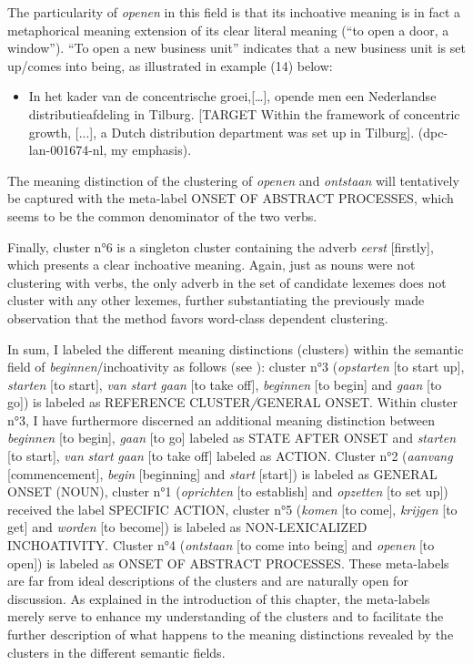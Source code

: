 The particularity of \textit{openen} in this field is that its inchoative meaning is in fact a metaphorical meaning extension of its clear literal meaning (“to open a door, a window”). “To open a new business unit” indicates that a new business unit is set up\slash comes into being, as illustrated in example (14) below:

\begin{itemize}
\item \begin{styleVoorbeeld}
In het kader van de concentrische groei,[…], opende men een Nederlandse distributieafdeling in Tilburg. [TARGET Within the framework of concentric growth, [...], a Dutch distribution department was set up in Tilburg]. (dpc-lan-001674-nl, my emphasis).
\end{styleVoorbeeld}
\end{itemize}

The meaning distinction of the clustering of \textit{openen} and \textit{ontstaan} will tentatively be captured with the meta-label ONSET OF ABSTRACT PROCESSES, which seems to be the common denominator of the two verbs.

Finally, cluster n°6 is a singleton cluster containing the adverb \textit{eerst} [firstly], which presents a clear inchoative meaning. Again, just as nouns were not clustering with verbs, the only adverb in the set of candidate lexemes does not cluster with any other lexemes, further substantiating the previously made observation that the method favors word-class dependent clustering.

In sum, I labeled the different meaning distinctions (clusters) within the semantic field of \textit{beginnen}/inchoativity as follows (see ): cluster n°3 (\textit{opstarten} [to start up], \textit{starten} [to start], \textit{van} \textit{start} \textit{gaan} [to take off], \textit{beginnen} [to begin] and \textit{gaan} [to go]) is labeled as REFERENCE CLUSTER\textit{/}GENERAL ONSET. Within cluster n°3, I have furthermore discerned an additional meaning distinction between \textit{beginnen} [to begin], \textit{gaan} [to go] labeled as STATE AFTER ONSET and \textit{starten} [to start], \textit{van} \textit{start} \textit{gaan} [to take off] labeled as ACTION. Cluster n°2 (\textit{aanvang} [commencement], \textit{begin} [beginning] and \textit{start} [start]) is labeled as GENERAL ONSET (NOUN), cluster n°1 (\textit{oprichten} [to establish] and \textit{opzetten} [to set up]) received the label {SPECIFIC} ACTION, cluster n°5 (\textit{komen} [to come], \textit{krijgen} [to get] and \textit{worden} [to become]) is labeled as {NON-LEXICALIZED INCHOATIVITY}. Cluster n°4 (\textit{ontstaan} [to come into being] and \textit{openen} [to open]) is labeled as {ONSET OF ABSTRACT PROCESSES}. These meta-labels are far from ideal descriptions of the clusters and are naturally open for discussion. As explained in the introduction of this chapter, the meta-labels merely serve to enhance my understanding of the clusters and to facilitate the further description of what happens to the meaning distinctions revealed by the clusters in the different semantic fields.


